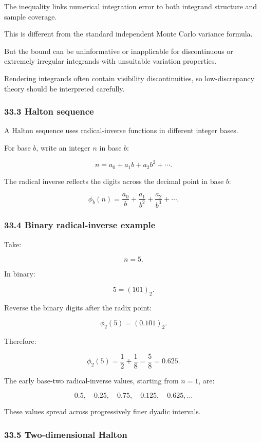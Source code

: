 The inequality links numerical integration error to both integrand structure and sample coverage.

This is different from the standard independent Monte Carlo variance formula.

But the bound can be uninformative or inapplicable for discontinuous or extremely irregular integrands with unsuitable variation properties.

Rendering integrands often contain visibility discontinuities, so low-discrepancy theory should be interpreted carefully.

\subsubsection{33.3 Halton sequence}\label{halton-sequence}

A Halton sequence uses radical-inverse functions in different integer bases.

For base \(b\), write an integer \(n\) in base \(b\):

\[ n=a_0+a_1b+a_2b^2+\cdots. \]

The radical inverse reflects the digits across the decimal point in base \(b\):

\[ \boxed{ \phi_b(n)= \frac{a_0}{b}+ \frac{a_1}{b^2}+ \frac{a_2}{b^3}+\cdots }. \]

\subsubsection{33.4 Binary radical-inverse example}\label{binary-radical-inverse-example}

Take:

\[ n=5. \]

In binary:

\[ 5=(101)_2. \]

Reverse the binary digits after the radix point:

\[ \phi_2(5)=(0.101)_2. \]

Therefore:

\[ \boxed{ \phi_2(5)=\frac12+\frac18=\frac58=0.625 }. \]

The early base-two radical-inverse values, starting from \(n=1\), are:

\[ 0.5,\quad0.25,\quad0.75,\quad0.125,\quad0.625,\ldots \]

These values spread across progressively finer dyadic intervals.

\subsubsection{33.5 Two-dimensional Halton}\label{two-dimensional-halton}

